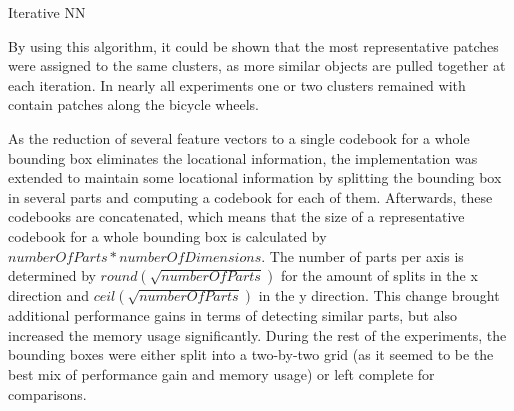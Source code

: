 \begin{algorithm}
	\caption{Iterative \ac{NN}}
	\label{alg:iterative_nn}
\end{algorithm}

By using this algorithm, it could be shown that the most representative patches were assigned to the same clusters, as more similar objects are pulled together at each iteration. In nearly all experiments one or two clusters remained with contain patches along the bicycle wheels.

\par
As the reduction of several feature vectors to a single codebook for a whole bounding box eliminates the locational information, the implementation was extended to maintain some locational information by splitting the bounding box in several parts and computing a codebook for each of them. Afterwards, these codebooks are concatenated, which means that the size of a representative codebook for a whole bounding box is calculated by $numberOfParts * numberOfDimensions$. The number of parts per axis is determined by $round(\sqrt{numberOfParts})$ for the amount of splits in the x direction and $ceil(\sqrt{numberOfParts})$ in the y direction. This change brought additional performance gains in terms of detecting similar parts, but also increased the memory usage significantly. During the rest of the experiments, the bounding boxes were either split into a two-by-two grid (as it seemed to be the best mix of performance gain and memory usage) or left complete for comparisons.
